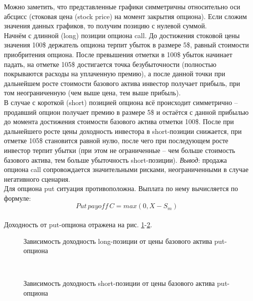 \documentclass{article}
\begin{document}
Можно заметить, что представленные графики симметричны относительно оси абсцисс (стоковая цена (stock price) на момент закрытия опциона). Если сложим значения данных графиков, то получим позицию с нулевой суммой.\\
Начнём с длинной (long) позиции опциона call. До достижения стоковой цены значения 100\$ держатель опциона терпит убыток в размере 5\$, равный стоимости приобритения опциона. После превышения отметки в 100\$ убыток начинает падать, на отметке 105\$ достигается точка безубыточности (полностью покрываются расходы на уплаченную премию), а после данной точки при дальнейшем росте стоимости базового актива инвестор получает прибыль, при том неограниченную (чем выше цена, тем выше прибыль).\\
В случае с короткой (short) позицией опциона всё происходит симметрично -- продавший опцион получает премию в размере 5\$ и остаётся с данной прибылью до момента достижения стоимости базового актива отметки 100\$. После при дальнейшего росте цены доходность инвестора в short-позиции снижается, при отметке 105\$ становится равной нулю, после чего при последующем росте инвестор терпит убытки (при этом не ограниченные -- чем больше стоимость базового актива, тем больше убыточность short-позиции). \textit{Вывод}: продажа опциона call сопровождается значительными рисками, неограниченными в случае негативного сценария.\\
Для опциона put ситуация противоположна. Выплата по нему вычисляется по формуле:
\[Put\,payoff \,C = max(0, X - S_m)\]\\
Доходность от put-опциона отражена на рис. \ref{pic3_long_put_price}-\ref{pic4_long_put_price}.\\
\begin{figure}[h]
    \caption{Зависимость доходность long-позиции от цены базового актива put-опциона}
    \label{pic3_long_put_price}
\end{figure}\\
\begin{figure}[h]
    \caption{Зависимость доходность short-позиции от цены базового актива put-опциона}
    \label{pic4_long_put_price}
\end{figure}\\
\end{document}
